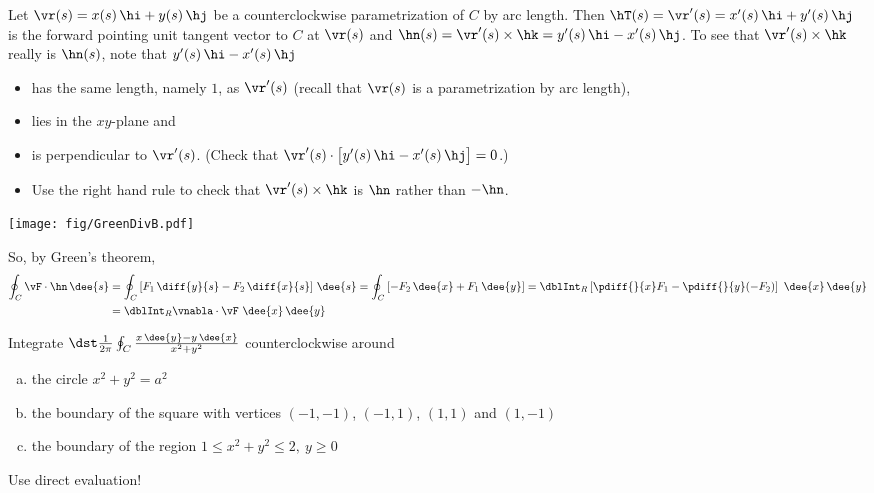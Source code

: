 \begin{solution}
Let $\vr(s)=x(s)\,\hi+y(s)\,\hj$ be a counterclockwise parametrization of
$C$ by arc length. Then $\hT(s) = \vr'(s) = x'(s)\,\hi+y'(s)\,\hj$
is the forward pointing unit tangent vector to $C$ at $\vr(s)$
and $\hn(s) = \vr'(s)\times\hk=y'(s)\,\hi-x'(s)\,\hj$. To see
that $\vr'(s)\times\hk$ really is $\hn(s)$, note that
$y'(s)\,\hi-x'(s)\,\hj$
\begin{itemize}\itemsep1pt \parskip0pt 
\item
has the same length, namely $1$, as $\vr'(s)$ (recall that $\vr(s)$ is a
parametrization by arc length),
\item
lies in the $xy$-plane and

\item
is perpendicular to $\vr'(s)$.
(Check that $\vr'(s)\cdot\big[y'(s)\,\hi-x'(s)\,\hj\big]=0$.)
\item
Use the right hand rule to check that $\vr'(s)\times\hk$ is
$\hn$ rather than $-\hn$.
\end{itemize}
\begin{center}
       \texttt{[image: fig/GreenDivB.pdf]}
\end{center}
So, by Green's theorem,
\begin{align*}
\oint_C\vF\cdot\hn\,\dee{s}
&=\oint_C\left[F_1\,\diff{y}{s}-F_2\,\diff{x}{s}\right]\,\dee{s}
=\oint_C\left[-F_2\,\dee{x}+F_1\,\dee{y}\right]
=\dblInt_R\left[\pdiff{}{x}F_1-\pdiff{}{y}(-F_2)\right]\ \dee{x}\,\dee{y} \\
&=\dblInt_R\vnabla\cdot\vF\ \dee{x}\,\dee{y}
\end{align*}
\end{solution}


\begin{question}\label{prb Green singular}
Integrate $\dst\frac{1}{2\pi}\oint_C \frac{x\,\dee{y}-y\,\dee{x}}{x^2+y^2}$
counterclockwise around
\begin{enumerate}[(a)]
\item the circle $x^2+y^2=a^2$
\item the boundary of the square with vertices
         $(-1,-1)$, $(-1,1)$, $(1,1)$ and $(1,-1)$
\item the boundary of the region $1\le x^2+y^2\le 2,\ y\ge0$
\end{enumerate}
\end{question}

\begin{hint}
Use direct evaluation!
\end{hint}

